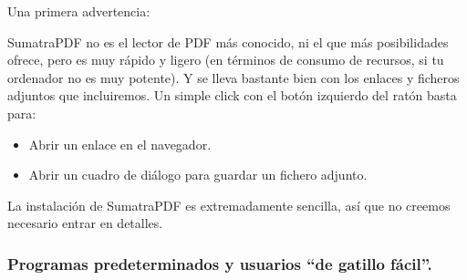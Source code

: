 \documentclass[10pt,a4paper]{article}\usepackage[]{graphicx}\usepackage[]{color}
\begin{document}
Una primera advertencia:
        \begin{center}
        \end{center}



SumatraPDF no es el lector de PDF más conocido, ni el que más posibilidades ofrece, pero es muy
rápido y ligero (en términos de consumo de recursos, si tu ordenador no es muy potente). Y se lleva
bastante bien con los enlaces y ficheros adjuntos que incluiremos. Un simple click con el botón
izquierdo del ratón basta para:
\begin{itemize}
  \item Abrir un enlace en el navegador.
  \item Abrir un cuadro de diálogo para guardar un fichero adjunto.
\end{itemize}
La instalación de SumatraPDF es extremadamente sencilla, así que no creemos necesario entrar en
detalles.

\subsubsection{Programas predeterminados y usuarios ``de gatillo fácil''.}
\end{document}
